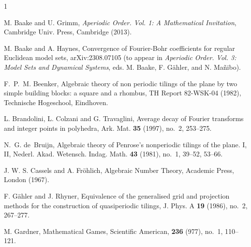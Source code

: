 \documentclass[reqno]{amsart}
\begin{document}
\begin{thebibliography}{1}
			

%

M. Baake and U. Grimm, {\it Aperiodic Order. Vol. 1: A Mathematical Invitation}, Cambridge Univ. Press, Cambridge (2013).

\vspace*{.1in}

M. Baake and A. Haynes, Convergence of Fourier-Bohr coefficients for regular Euclidean model sets, arXiv:2308.07105 (to appear in {\it Aperiodic Order. Vol. 3: Model Sets and Dynamical Systems}, eds. M. Baake, F. G\"ahler, and N. Ma\~nibo).

\vspace*{.1in}

F.~P.~M. Beenker, Algebraic theory of non periodic tilings of the plane by two simple building blocks: a square and a rhombus, TH Report 82-WSK-04 (1982), Technische Hogeschool, Eindhoven.

\vspace*{.1in}

L. Brandolini, L. Colzani and G. Travaglini, Average decay of Fourier transforms and integer points in polyhedra, Ark. Mat. {\bf 35} (1997), no.~2, 253--275.

\vspace*{.1in}

N.~G. de~Bruijn, Algebraic theory of Penrose's nonperiodic tilings of the plane. I, II, Nederl. Akad. Wetensch. Indag. Math. {\bf 43} (1981), no.~1, 39--52, 53--66.

\vspace*{.1in}

J. W. S. Cassels and A. Fröhlich, Algebraic Number Theory, Academic Press, London (1967).

\vspace*{.1in}

F. G\"ahler and J. Rhyner, Equivalence of the generalised grid and projection methods for the construction of quasiperiodic tilings, J. Phys. A {\bf 19} (1986), no.~2, 267--277.

\vspace*{.1in}

M. Gardner, Mathematical Games, Scientific American, {\bf 236} (977), no.~1, 110--121.


\end{thebibliography}
\end{document}

